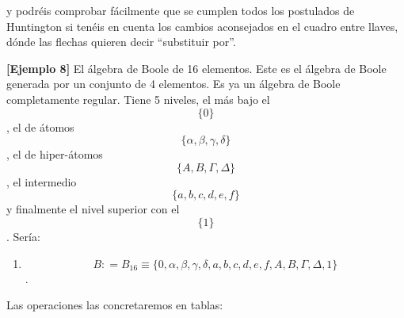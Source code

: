 \documentclass[
]{article}
\providecommand{\tightlist}{%
  \setlength{\itemsep}{0pt}\setlength{\parskip}{0pt}}
\begin{document}
\begin{enumerate}
  y podréis comprobar fácilmente que se cumplen todos los postulados de
  Huntington si te\-néis en cuenta los cambios aconsejados en el cuadro
  entre llaves, dónde las flechas quieren decir ``substituir por''.

  \textbf{{[}Ejemplo 8{]}} El álgebra de Boole de 16 elementos. Este es
  el álgebra de Boole generada por un conjunto de 4 elementos. Es ya un
  álgebra de Boole completamente regular. Tiene 5 niveles, el más bajo
  el \[\{ 0\}\], el de átomos \[\{{\alpha,\beta,\gamma,\delta}\}\], el
  de hiper-átomos \[\{{Α,Β,\Gamma,\Delta}\}\] , el intermedio
  \[\{{a,b,c,d,e,f}\}\]y finalmente el nivel superior con el \[\{ 1\}\].
  Sería:

  \begin{enumerate}
  \def\labelenumii{\arabic{enumii}.}
  \setcounter{enumii}{1}
  \tightlist
  \item
    \[B{{: = B_{16}} \equiv {\{{0,\alpha,\beta,\gamma,\delta,a,b,c,d,e,f,Α,Β,\Gamma,\Delta,1}\}}}\].
  \end{enumerate}

  Las operaciones las concretaremos en tablas:


\end{enumerate}
\end{document}
